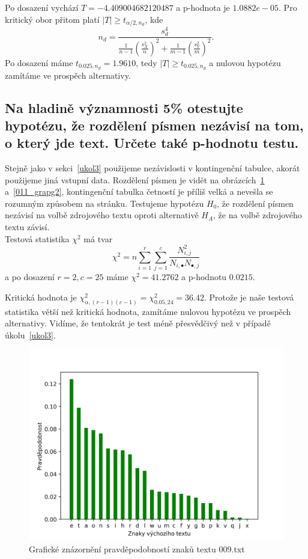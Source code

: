 \documentclass[12pt]{article}
\begin{document}
Po dosazení vychází $T = -4.409004682120487$ a p-hodnota je $1.0882e-05$.
Pro kritický obor přitom platí $|T| \ge t_{\alpha/2,n_d}$, kde
$$n_d = \frac{s_d^4}{\frac{1}{n-1}(\frac{s_X^2}{n})^2+\frac{1}{m-1}(\frac{s_Y^2}{m})^2}.$$
Po dosazení máme $t_{0.025, n_d} = 1.9610$, tedy $|T| \ge t_{0.025, n_d}$ a nulovou hypotézu zamítáme ve prospěch
alternativy.

  \subsection{Na hladině významnosti 5\% otestujte hypotézu, že rozdělení písmen nezávisí na tom, o který jde text. Určete také p-hodnotu testu.}
    Stejně jako v sekci~\ref{ukol3} použijeme nezávislosti v kontingenční tabulce, akorát použijeme jiná vstupní data.
    Rozdělení písmen je vidět na obrázcích~\ref{009_graph2} a~\ref{011_grapg2}, kontingenční tabulka četností je příliš
    velká a nevešla se rozumným způsobem na stránku. Testujeme hypotézu $H_0$, že rozdělení
    písmen nezávisí na volbě zdrojového textu oproti alternativě $H_A$, že na volbě zdrojového textu závisí. \\
   
Testová statistika $\chi^2$ má tvar
$$\chi^2 = n\sum_{i =1}^r\sum_{j=1}^c \frac{N_{i,j}^2}{N_{i, \bullet}N_{\bullet, j}}$$
a po dosazení $r=2, c=25$ máme $\chi^2 = 41.2762$ a p-hodnotu $0.0215$.

Kritická hodnota je $\chi^2_{\alpha, (r-1)(c-1)} = \chi^2_{0.05,24} = 36.42$. Protože je naše testová statistika větší
než kritická hodnota, zamítáme nulovou hypotézu ve prospěch alternativy. Vidíme, že tentokrát je test méně přesvědčivý
než v případě úkolu~\ref{ukol3}.

\begin{figure}[!ht]
\includegraphics[scale=0.8]{009_char_prob.png}\centering\caption{Grafické znázornění pravděpodobností znaků textu 009.txt}\label{009_graph2}
\end{figure}
\end{document}
